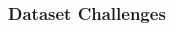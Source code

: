 \documentclass[aspectratio=169, 11pt]{beamer}
\begin{document}
\begin{frame}
\begin{columns}
    \begin{column}{0.05\textwidth} %

    \end{column}

    \begin{column}{0.1\textwidth} %
    \end{column}
  \end{columns}

\end{frame}



\begin{frame}
  \frametitle{Dataset Challenges}

  \begin{columns}
    \begin{column}{0.1\textwidth} %

\end{column}
\end{columns}
\end{frame}
\end{document}
